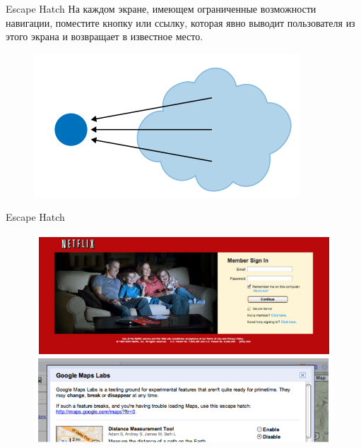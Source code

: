 \documentclass{beamer}
\begin{document}
\begin{frame}[t]{Escape Hatch}
	На каждом экране, имеющем ограниченные возможности навигации, поместите кнопку или ссылку, которая явно выводит пользователя из этого экрана и возвращает в известное место. 
	\begin{figure}[h]
		\centering
		\includegraphics[scale=0.75]{images/lec07-pic35.png}
	\end{figure}
\end{frame}

\begin{frame}[t]{Escape Hatch}
	\begin{figure}[h]
		\centering
		\includegraphics[scale=0.5]{images/lec07-pic36.png}
	\end{figure}
\end{frame}	
\end{document}
